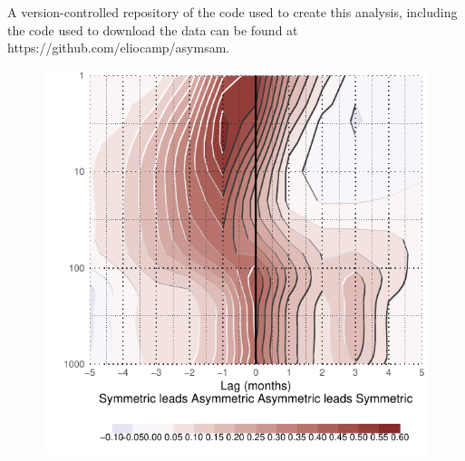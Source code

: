 \documentclass[]{ametsocV5}
\begin{document}
A version-controlled repository of the code used to create this
analysis, including the code used to download the data can be found at
https://github.com/eliocamp/asymsam.



\newpage

\appendix


\begin{figure}
\includegraphics{A1-1} \label{fig:A1}
\end{figure}
\end{document}
